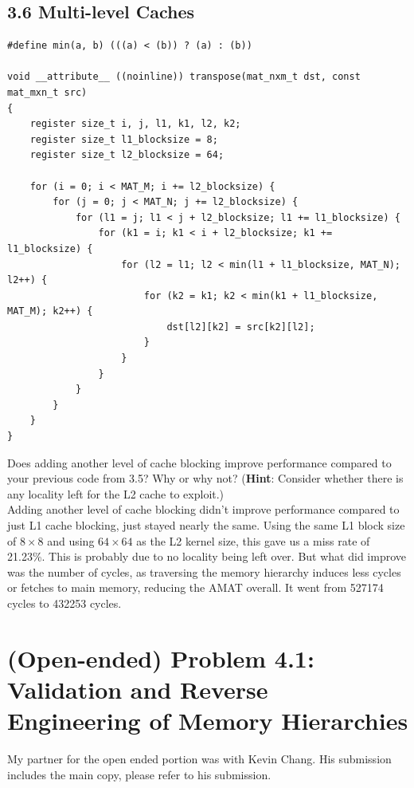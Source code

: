 \documentclass[11pt]{article}
\begin{document}
\subsection*{3.6 Multi-level Caches}
\lstset{language=c}
\begin{lstlisting}
#define min(a, b) (((a) < (b)) ? (a) : (b))

void __attribute__ ((noinline)) transpose(mat_nxm_t dst, const mat_mxn_t src)
{
    register size_t i, j, l1, k1, l2, k2;
    register size_t l1_blocksize = 8;
    register size_t l2_blocksize = 64;
    
    for (i = 0; i < MAT_M; i += l2_blocksize) {
        for (j = 0; j < MAT_N; j += l2_blocksize) {
            for (l1 = j; l1 < j + l2_blocksize; l1 += l1_blocksize) {
                for (k1 = i; k1 < i + l2_blocksize; k1 += l1_blocksize) {
                    for (l2 = l1; l2 < min(l1 + l1_blocksize, MAT_N); l2++) {
                        for (k2 = k1; k2 < min(k1 + l1_blocksize, MAT_M); k2++) {
                            dst[l2][k2] = src[k2][l2];
                        }
                    }
                }
            }
        }
    }
}
\end{lstlisting}

\begin{Parts}
	\Part Does adding another level of cache blocking improve performance compared to your previous code from 3.5? Why or why not? (\textbf{Hint}: Consider whether there is any locality left for the L2 cache to exploit.) \\
	Adding another level of cache blocking didn't improve performance compared to just L1 cache blocking, just stayed nearly the same. Using the same L1 block size of $8\times8$ and using $64\times64$ as the L2 kernel size, this gave us a miss rate of 21.23\%. This is probably due to no locality being left over. But what did improve was the number of cycles, as traversing the memory hierarchy induces less cycles or fetches to main memory, reducing the AMAT overall. It went from 527174 cycles to 432253 cycles.
\end{Parts}

\newpage

\section*{(Open-ended) Problem 4.1: Validation and Reverse Engineering of Memory Hierarchies}
My partner for the open ended portion was with Kevin Chang. His submission includes the main copy, please refer to his submission.
\end{document}
